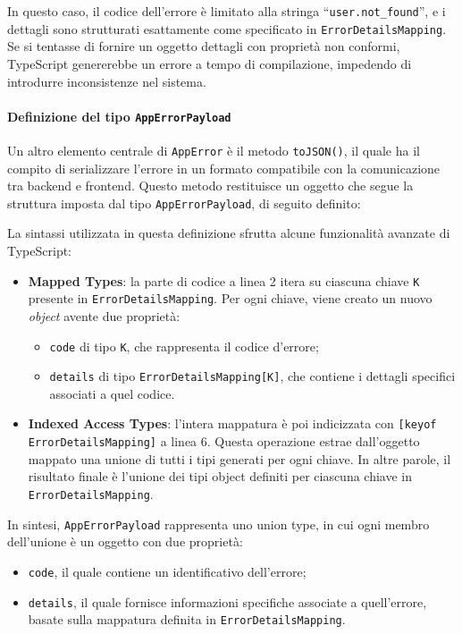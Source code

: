 
%
In questo caso, il codice dell'errore è limitato alla stringa ``\texttt{user.not\_found}'', e i dettagli sono strutturati esattamente come specificato in \texttt{ErrorDetailsMapping}. Se si tentasse di fornire un oggetto dettagli con proprietà non conformi, TypeScript genererebbe un errore a tempo di compilazione, impedendo di introdurre inconsistenze nel sistema.

\paragraph{Definizione del tipo \texttt{AppErrorPayload}}
Un altro elemento centrale di \texttt{AppError} è il metodo \texttt{toJSON()}, il quale ha il compito di serializzare l’errore in un formato compatibile con la comunicazione tra backend e frontend. Questo metodo restituisce un oggetto che segue la struttura imposta dal tipo \texttt{AppErrorPayload}, di seguito definito:


La sintassi utilizzata in questa definizione sfrutta alcune funzionalità avanzate di TypeScript:
\begin{itemize}
  \item \textbf{Mapped Types}: la parte di codice a linea 2 itera su ciascuna chiave \texttt{K} presente in \texttt{ErrorDetailsMapping}. Per ogni chiave, viene creato un nuovo \textit{object} avente due proprietà:
    \begin{itemize}
      \item \texttt{code} di tipo \texttt{K}, che rappresenta il codice d’errore;
      \item \texttt{details} di tipo \texttt{ErrorDetailsMapping[K]}, che contiene i dettagli specifici associati a quel codice.
    \end{itemize}

  \item \textbf{Indexed Access Types}: l'intera mappatura è poi indicizzata con \texttt{[keyof ErrorDetailsMapping]} a linea 6. Questa operazione estrae dall'oggetto mappato una unione di tutti i tipi generati per ogni chiave. In altre parole, il risultato finale è l'unione dei tipi object definiti per ciascuna chiave in \texttt{ErrorDetailsMapping}.
\end{itemize}
%
In sintesi, \texttt{AppErrorPayload} rappresenta uno union type, in cui ogni membro dell'unione è un oggetto con due proprietà:
\begin{itemize}
  \item \texttt{code}, il quale contiene un identificativo dell'errore;
  \item \texttt{details}, il quale fornisce informazioni specifiche associate a quell'errore, basate sulla mappatura definita in \texttt{ErrorDetailsMapping}.
\end{itemize}

